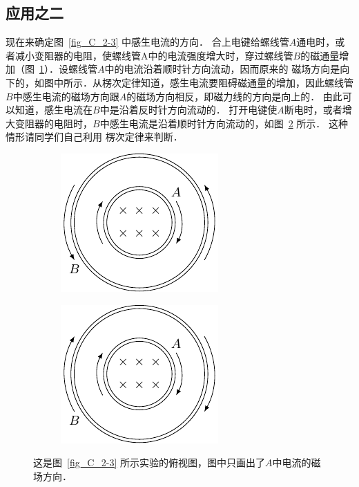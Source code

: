 \subsection*{应用之二}


现在来确定图~\ref{fig_C_2-3} 中感生电流的方向．
合上电键给螺线管$A$通电时，或者减小变阻器的电阻，使螺线管A中的电流强度增大时，穿过螺线管$B$的磁通量增加（图~\ref{fig_C_2-13a}）．设螺线管$A$中的电流沿着顺时针方向流动，因而原来的
磁场方向是向下的，如图中所示．从楞次定律知道，感生电流要阻碍磁通量的增加，因此螺线管$B$中感生电流的磁场方向跟$A$的磁场方向相反，即磁力线的方向是向上的．
由此可以知道，感生电流在$B$中是沿着反时针方向流动的．
打开电键使$A$断电时，或者增大变阻器的电阻时，$B$中感生电流是沿着顺时针方向流动的，如图~\ref{fig_C_2-13b} 所示．
这种情形请同学们自己利用
楞次定律来判断．
\begin{figure}[htbp]
    \centering
    \begin{subfigure}{0.4\linewidth}
        \centering
        \includegraphics{fig/C/2-13a.pdf}
        \caption{}\label{fig_C_2-13a}
    \end{subfigure}
    \hfil
    \begin{subfigure}{0.4\linewidth}
        \centering
        \includegraphics{fig/C/2-13b.pdf}
        \caption{}\label{fig_C_2-13b}
    \end{subfigure}
    \caption{这是图~\ref{fig_C_2-3} 所示实验的俯视图，图中只画出了$A$中电流的磁场方向．}\label{fig_C_2-13}
\end{figure}

